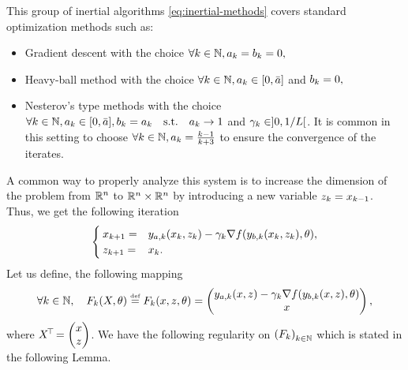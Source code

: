 This group of inertial algorithms \eqref{eq:inertial-methods} covers standard optimization methods such as:
\begin{itemize}
\item Gradient descent with the choice $\forall k\in\mathbb{N}, a_{k}=b_{k}=0,$
\item  Heavy-ball method \cite{polyak_methods_1964} with the choice $\forall k\in\mathbb{N}, a_{k}\in [0,\bar{a}]$ and  $b_{k}=0,$
\item Nesterov's type methods \cite{nesterov_method_1983}  with the choice $\forall k\in\mathbb{N}, a_{k}\in [0,\bar{a}], b_{k}=a_{k} \quad \mathrm{s.t.}\quad a_{k}\to1$ and $\gamma_{k}\in]0,1/L[$. It is common in this setting to choose $\forall k\in\mathbb{N}, a_{k}=\frac{k-1}{k+3}$ to ensure the  convergence of the iterates.
\end{itemize}
A common  way to properly  analyze this system is to increase the dimension of the problem from $\mathbb{R}^n$ to $\mathbb{R}^n\times\mathbb{R}^n$ by introducing a new variable ${z}_{k}=x_{k-1}$. Thus, we get the following iteration 
\begin{equation}\label{eq:nest-system}
\begin{cases}
x_{k+1}=&y_{a,k}(x_{k},{z}_{k})-\gamma_{k}\nabla f(y_{b,k}(x_{k},{z}_{k}),\theta),\\
{z}_{k+1}=&x_{k}.
\end{cases}
\end{equation}
Let us define, the following mapping
\begin{equation}\label{eq:mapping}
\forall k\in\mathbb{N}, \quad F_k(X,\theta)\stackrel{\text{\rm\tiny def}}{=} F_k(x,z,\theta)=\begin{pmatrix}
y_{a,k}(x,z)-\gamma_{k}\nabla f(y_{b,k}(x,z),\theta)\\
x
\end{pmatrix},
\end{equation}
where ${X}^{\!\top\!}=\begin{pmatrix}x\\z\end{pmatrix}$. We have the following regularity on  $\left(F_k
\right)_{k\in\mathbb{N}}$ which is stated in the following Lemma. 

